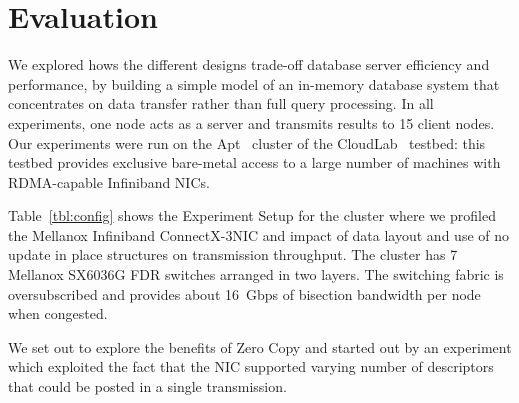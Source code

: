 
\chapter{Evaluation}

We explored hows the different designs trade-off database server efficiency and
performance, by building a simple model of an in-memory database system that
concentrates on data transfer rather than full query processing. In all experiments,
one node acts as a server and transmits results to 15 client nodes.
Our experiments were run on the Apt~\cite{Ricci+:OSR15} cluster of the
CloudLab~\cite{Cloudlab:URL} testbed: this testbed provides exclusive bare-metal
access to a large number of machines with RDMA-capable Infiniband NICs.


Table~\ref{tbl:config} shows the Experiment Setup for the cluster where we profiled
the Mellanox Infiniband ConnectX-3\textregistered NIC and impact of data layout and 
use of no update in place structures on transmission throughput. The cluster has 7
Mellanox SX6036G FDR switches arranged in two layers. The switching fabric is
oversubscribed and provides about 16~Gbps of bisection bandwidth per node
when congested.

We set out to explore the benefits of Zero Copy and started out by an experiment 
which exploited the fact that the NIC supported varying number of descriptors 
that could be posted in a single transmission. 


